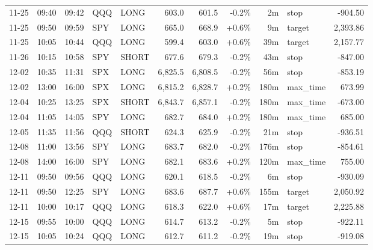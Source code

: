 \documentclass[11pt,a4paper,twoside]{article}
\begin{document}
\begin{center}
\begin{longtable}{>{\color{txtmain}}l l l l l r r r r >{\color{txtmain}}l r}
11-25 & 09:40 & 09:42 & QQQ & LONG & 603.0 & 601.5 & \textcolor{lossred}{-0.2\%} & 2m & stop & \textcolor{lossred}{-904.50} \\
11-25 & 09:50 & 09:59 & SPY & LONG & 665.0 & 668.9 & \textcolor{wingreen}{+0.6\%} & 9m & target & \textcolor{wingreen}{2,393.86} \\
11-25 & 10:05 & 10:44 & QQQ & LONG & 599.4 & 603.0 & \textcolor{wingreen}{+0.6\%} & 39m & target & \textcolor{wingreen}{2,157.77} \\
11-26 & 10:15 & 10:58 & SPY & SHORT & 677.6 & 679.3 & \textcolor{lossred}{-0.2\%} & 43m & stop & \textcolor{lossred}{-847.00} \\
12-02 & 10:35 & 11:31 & SPX & LONG & 6,825.5 & 6,808.5 & \textcolor{lossred}{-0.2\%} & 56m & stop & \textcolor{lossred}{-853.19} \\
12-02 & 13:00 & 16:00 & SPX & LONG & 6,815.2 & 6,828.7 & \textcolor{wingreen}{+0.2\%} & 180m & max\_time & \textcolor{wingreen}{673.99} \\
12-04 & 10:25 & 13:25 & SPX & SHORT & 6,843.7 & 6,857.1 & \textcolor{lossred}{-0.2\%} & 180m & max\_time & \textcolor{lossred}{-673.00} \\
12-04 & 11:05 & 14:05 & SPY & LONG & 682.7 & 684.0 & \textcolor{wingreen}{+0.2\%} & 180m & max\_time & \textcolor{wingreen}{685.00} \\
12-05 & 11:35 & 11:56 & QQQ & SHORT & 624.3 & 625.9 & \textcolor{lossred}{-0.2\%} & 21m & stop & \textcolor{lossred}{-936.51} \\
12-08 & 11:00 & 13:56 & SPY & LONG & 683.7 & 682.0 & \textcolor{lossred}{-0.2\%} & 176m & stop & \textcolor{lossred}{-854.61} \\
12-08 & 14:00 & 16:00 & SPY & LONG & 682.1 & 683.6 & \textcolor{wingreen}{+0.2\%} & 120m & max\_time & \textcolor{wingreen}{755.00} \\
12-11 & 09:50 & 09:56 & QQQ & LONG & 620.1 & 618.5 & \textcolor{lossred}{-0.2\%} & 6m & stop & \textcolor{lossred}{-930.09} \\
12-11 & 09:50 & 12:25 & SPY & LONG & 683.6 & 687.7 & \textcolor{wingreen}{+0.6\%} & 155m & target & \textcolor{wingreen}{2,050.92} \\
12-11 & 10:00 & 10:17 & QQQ & LONG & 618.3 & 622.0 & \textcolor{wingreen}{+0.6\%} & 17m & target & \textcolor{wingreen}{2,225.88} \\
12-15 & 09:55 & 10:00 & QQQ & LONG & 614.7 & 613.2 & \textcolor{lossred}{-0.2\%} & 5m & stop & \textcolor{lossred}{-922.11} \\
12-15 & 10:05 & 10:24 & QQQ & LONG & 612.7 & 611.2 & \textcolor{lossred}{-0.2\%} & 19m & stop & \textcolor{lossred}{-919.08} \\

\end{longtable}
\end{center}
\end{document}
